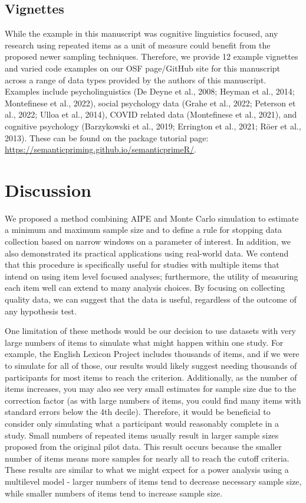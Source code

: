 \documentclass[
  man]{apa7}
\begin{document}
\subsection{Vignettes}\label{vignettes}

While the example in this manuscript was cognitive linguistics focused, any research using repeated items as a unit of measure could benefit from the proposed newer sampling techniques. Therefore, we provide 12 example vignettes and varied code examples on our OSF page/GitHub site for this manuscript across a range of data types provided by the authors of this manuscript. Examples include psycholinguistics (De Deyne et al., 2008; Heyman et al., 2014; Montefinese et al., 2022), social psychology data (Grahe et al., 2022; Peterson et al., 2022; Ulloa et al., 2014), COVID related data (Montefinese et al., 2021), and cognitive psychology (Barzykowski et al., 2019; Errington et al., 2021; Röer et al., 2013). These can be found on the package tutorial page: \url{https://semanticpriming.github.io/semanticprimeR/}.

\section{Discussion}\label{discussion}

We proposed a method combining AIPE and Monte Carlo simulation to estimate a minimum and maximum sample size and to define a rule for stopping data collection based on narrow windows on a parameter of interest. In addition, we also demonstrated its practical applications using real-world data. We contend that this procedure is specifically useful for studies with multiple items that intend on using item level focused analyses; furthermore, the utility of measuring each item well can extend to many analysis choices. By focusing on collecting quality data, we can suggest that the data is useful, regardless of the outcome of any hypothesis test.

One limitation of these methods would be our decision to use datasets with very large numbers of items to simulate what might happen within one study. For example, the English Lexicon Project includes thousands of items, and if we were to simulate for all of those, our results would likely suggest needing thousands of participants for most items to reach the criterion. Additionally, as the number of items increases, you may also see very small estimates for sample size due to the correction factor (as with large numbers of items, you could find many items with standard errors below the 4th decile). Therefore, it would be beneficial to consider only simulating what a participant would reasonably complete in a study. Small numbers of repeated items usually result in larger sample sizes proposed from the original pilot data. This result occurs because the smaller number of items means more samples for nearly all to reach the cutoff criteria. These results are similar to what we might expect for a power analysis using a multilevel model - larger numbers of items tend to decrease necessary sample size, while smaller numbers of items tend to increase sample size.
\end{document}
